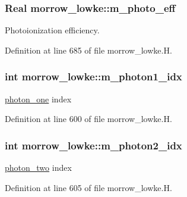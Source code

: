 \subsubsection[{\texorpdfstring{m\+\_\+photo\+\_\+eff}{m_photo_eff}}]{\setlength{\rightskip}{0pt plus 5cm}Real morrow\+\_\+lowke\+::m\+\_\+photo\+\_\+eff}\hypertarget{classmorrow__lowke_a7f59aae10b05a048b30d26ccfbfa4f11}{}\label{classmorrow__lowke_a7f59aae10b05a048b30d26ccfbfa4f11}


Photoionization efficiency. 



Definition at line 685 of file morrow\+\_\+lowke.\+H.

\subsubsection[{\texorpdfstring{m\+\_\+photon1\+\_\+idx}{m_photon1_idx}}]{\setlength{\rightskip}{0pt plus 5cm}int morrow\+\_\+lowke\+::m\+\_\+photon1\+\_\+idx}\hypertarget{classmorrow__lowke_ad96cda8f8460278fc3b4847242aeb43f}{}\label{classmorrow__lowke_ad96cda8f8460278fc3b4847242aeb43f}


\hyperlink{classmorrow__lowke_1_1photon__one}{photon\+\_\+one} index 



Definition at line 600 of file morrow\+\_\+lowke.\+H.

\subsubsection[{\texorpdfstring{m\+\_\+photon2\+\_\+idx}{m_photon2_idx}}]{\setlength{\rightskip}{0pt plus 5cm}int morrow\+\_\+lowke\+::m\+\_\+photon2\+\_\+idx}\hypertarget{classmorrow__lowke_a91423165837de0753506cfccdb151eda}{}\label{classmorrow__lowke_a91423165837de0753506cfccdb151eda}


\hyperlink{classmorrow__lowke_1_1photon__two}{photon\+\_\+two} index 



Definition at line 605 of file morrow\+\_\+lowke.\+H.

